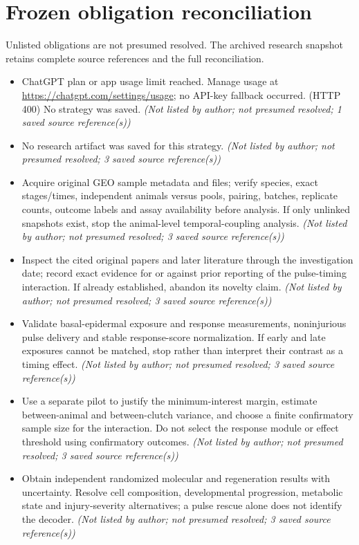 \documentclass[11pt]{article}
\begin{document}
\section{Frozen obligation reconciliation}
Unlisted obligations are not presumed resolved. The archived research snapshot retains complete source references and the full reconciliation.
\begin{itemize}
\item ChatGPT plan or app usage limit reached. Manage usage at \url{https://chatgpt.com/settings/usage}; no API-key fallback occurred. (HTTP 400) No strategy was saved. \textit{ (Not listed by author; not presumed resolved; 1 saved source reference(s))}
\item No research artifact was saved for this strategy. \textit{ (Not listed by author; not presumed resolved; 3 saved source reference(s))}
\item Acquire original GEO sample metadata and files; verify species, exact stages/times, independent animals versus pools, pairing, batches, replicate counts, outcome labels and assay availability before analysis. If only unlinked snapshots exist, stop the animal-level temporal-coupling analysis. \textit{ (Not listed by author; not presumed resolved; 3 saved source reference(s))}
\item Inspect the cited original papers and later literature through the investigation date; record exact evidence for or against prior reporting of the pulse-timing interaction. If already established, abandon its novelty claim. \textit{ (Not listed by author; not presumed resolved; 3 saved source reference(s))}
\item Validate basal-epidermal exposure and response measurements, noninjurious pulse delivery and stable response-score normalization. If early and late exposures cannot be matched, stop rather than interpret their contrast as a timing effect. \textit{ (Not listed by author; not presumed resolved; 3 saved source reference(s))}
\item Use a separate pilot to justify the minimum-interest margin, estimate between-animal and between-clutch variance, and choose a finite confirmatory sample size for the interaction. Do not select the response module or effect threshold using confirmatory outcomes. \textit{ (Not listed by author; not presumed resolved; 3 saved source reference(s))}
\item Obtain independent randomized molecular and regeneration results with uncertainty. Resolve cell composition, developmental progression, metabolic state and injury-severity alternatives; a pulse rescue alone does not identify the decoder. \textit{ (Not listed by author; not presumed resolved; 3 saved source reference(s))}

\end{itemize}
\end{document}
